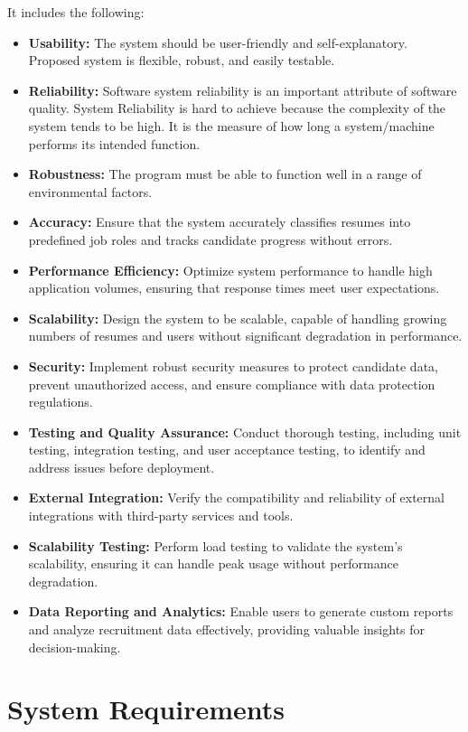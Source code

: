 It includes the following:
\begin{itemize}
	\item \textbf{Usability:}  The system should be user-friendly and self-explanatory. Proposed system is flexible, robust, and easily testable.
	\item \textbf{Reliability:}  Software system reliability is an important attribute of software quality. System Reliability is hard to achieve because the complexity of the system tends to be high. It is the measure of how long a system/machine performs its intended function.
	\item \textbf{Robustness:}  The program must be able to function well in a range of environmental factors.
	\item \textbf{Accuracy:} Ensure that the system accurately classifies resumes into predefined job roles and tracks candidate progress without errors.
	\item \textbf{Performance Efficiency:} Optimize system performance to handle high application volumes, ensuring that response times meet user expectations.
	\item \textbf{Scalability:} Design the system to be scalable, capable of handling growing numbers of resumes and users without significant degradation in performance.
	\item \textbf{Security:} Implement robust security measures to protect candidate data, prevent unauthorized access, and ensure compliance with data protection regulations.
	\item \textbf{Testing and Quality Assurance:} Conduct thorough testing, including unit testing, integration testing, and user acceptance testing, to identify and address issues before deployment.
	\item \textbf{External Integration:} Verify the compatibility and reliability of external integrations with third-party services and tools.
	\item \textbf{Scalability Testing:} Perform load testing to validate the system's scalability, ensuring it can handle peak usage without performance degradation.
	\item \textbf{Data Reporting and Analytics:} Enable users to generate custom reports and analyze recruitment data effectively, providing valuable insights for decision-making.
\end{itemize}


\section{System Requirements}

